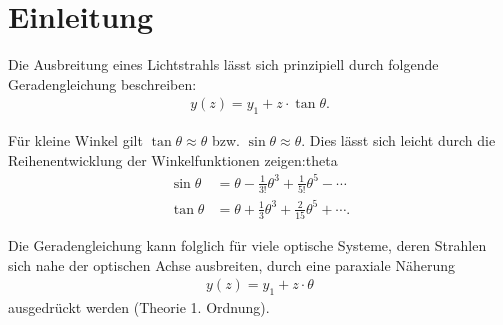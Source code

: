 \section{Einleitung}

Die Ausbreitung eines Lichtstrahls lässt sich prinzipiell durch folgende Geradengleichung beschreiben:
\begin{align*}
y(z)=y_1 + z \cdot \tan \theta.
\end{align*}

Für kleine Winkel gilt $\tan\theta \approx \theta$ bzw. $\sin \theta \approx \theta $. Dies lässt sich leicht durch die Reihenentwicklung der Winkelfunktionen zeigen:theta
\begin{align*}
\sin \theta &= \theta - \frac{1}{3!}\theta^3 + \frac{1}{5!}\theta^5 - \cdots \\
\tan \theta &= \theta + \frac{1}{3}\theta^3 + \frac{2}{15}\theta^5 + \cdots.
\end{align*}

Die Geradengleichung kann folglich für viele optische Systeme, deren Strahlen sich nahe der optischen Achse ausbreiten, durch eine paraxiale Näherung 
\begin{align*}
y(z)=y_1 + z \cdot \theta
\end{align*}
ausgedrückt werden (Theorie 1. Ordnung).

